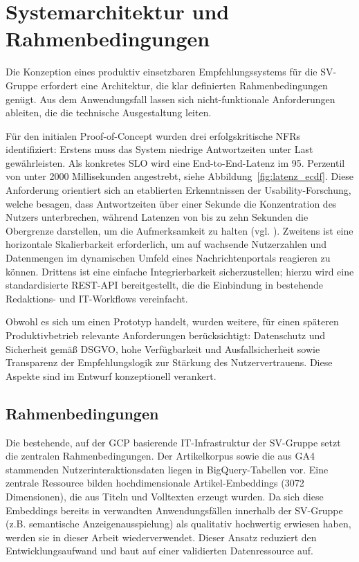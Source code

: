 \section{Systemarchitektur und Rahmenbedingungen}
Die Konzeption eines produktiv einsetzbaren Empfehlungssystems für die SV-Gruppe erfordert eine Architektur, 
die klar definierten Rahmenbedingungen genügt. Aus dem Anwendungsfall lassen sich nicht-funktionale Anforderungen ableiten,
 die die technische Ausgestaltung leiten.
\label{sec:nfr}

Für den initialen Proof-of-Concept wurden drei erfolgskritische \ac{NFR}s identifiziert:
Erstens muss das System niedrige Antwortzeiten unter Last gewährleisten. Als konkretes \ac{SLO} wird eine End-to-End-Latenz 
im 95. Perzentil von unter 2000 Millisekunden angestrebt, siehe Abbildung~\ref{fig:latenz_ecdf}. Diese Anforderung orientiert sich an etablierten 
Erkenntnissen der Usability-Forschung, welche besagen, dass Antwortzeiten über einer Sekunde die Konzentration des 
Nutzers unterbrechen, während Latenzen von bis zu zehn Sekunden die Obergrenze darstellen, um die Aufmerksamkeit zu halten 
(vgl. \cite{Nielsen_Response_Times_1993}).
Zweitens ist eine horizontale Skalierbarkeit erforderlich, um auf wachsende Nutzerzahlen und Datenmengen 
im dynamischen Umfeld eines Nachrichtenportals reagieren zu können.
Drittens ist eine einfache Integrierbarkeit sicherzustellen; hierzu wird eine standardisierte REST-API bereitgestellt, 
die die Einbindung in bestehende Redaktions- und IT-Workflows vereinfacht.


Obwohl es sich um einen Prototyp handelt, wurden weitere, für einen späteren Produktivbetrieb relevante Anforderungen 
berücksichtigt: Datenschutz und Sicherheit gemäß \ac{DSGVO}, hohe Verfügbarkeit und Ausfallsicherheit sowie 
Transparenz der Empfehlungslogik zur Stärkung des Nutzervertrauens. Diese Aspekte sind im Entwurf konzeptionell verankert.

\subsection{Rahmenbedingungen}
Die bestehende, auf der \ac{GCP} basierende IT-Infrastruktur der SV-Gruppe setzt die zentralen Rahmenbedingungen. 
Der Artikelkorpus sowie die aus \ac{GA4} stammenden Nutzerinteraktionsdaten liegen in BigQuery-Tabellen vor. 
Eine zentrale Ressource bilden hochdimensionale Artikel-Embeddings (3072 Dimensionen), die aus Titeln und Volltexten 
erzeugt wurden. Da sich diese Embeddings bereits in verwandten Anwendungsfällen innerhalb der \ac{SV-Gruppe} 
(z.B. semantische Anzeigenausspielung) als qualitativ hochwertig erwiesen haben, werden sie in dieser Arbeit wiederverwendet. 
Dieser Ansatz reduziert den Entwicklungsaufwand und baut auf einer validierten Datenressource auf.

